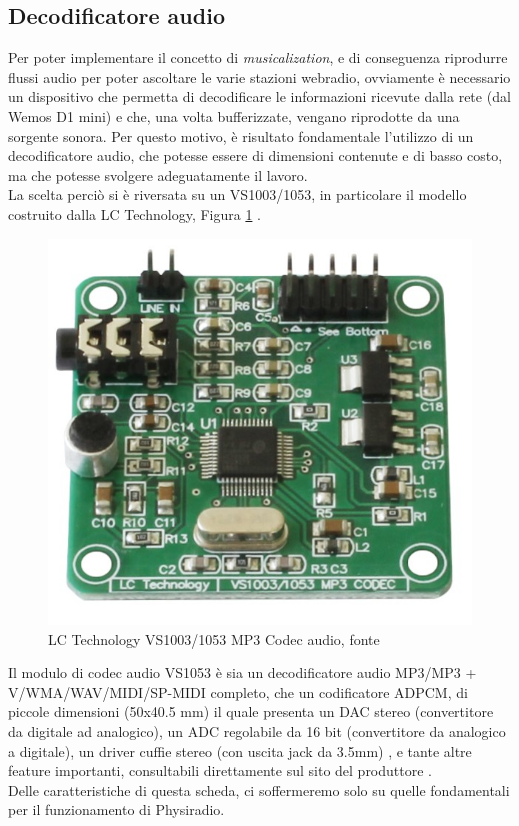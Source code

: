 \documentclass[12pt,a4paper]{report}
\newcommand{\physiradio}{Physiradio} %
\begin{document}
\subsection{Decodificatore audio}\label{sec:vs1053} %

Per poter implementare il concetto di \textit{musicalization}, e di conseguenza riprodurre flussi audio per poter ascoltare le varie stazioni webradio, ovviamente è necessario un dispositivo che permetta di decodificare le informazioni ricevute dalla rete (dal Wemos D1 mini) e che, una volta bufferizzate, vengano riprodotte da una sorgente sonora. 
Per questo motivo, è risultato fondamentale l'utilizzo di un decodificatore audio, che potesse essere di dimensioni contenute e di basso costo, ma che potesse svolgere adeguatamente il lavoro.\\
La scelta perciò si è riversata su un VS1003/1053, in particolare il modello costruito dalla LC Technology, Figura \ref{fig:vs1053} .

\begin{figure}[h]
	\begin{center}
		\centerline{\includegraphics[scale=0.35]{Immagini/LCTech_VS1053.jpg}}
		\caption{LC Technology VS1003/1053 MP3 Codec audio, fonte \cite{lcTechnologyVS1053}}
		\label{fig:vs1053}
	\end{center}
\end{figure}

Il modulo di codec audio VS1053 è sia un decodificatore audio MP3/MP3 + V/WMA/WAV/MIDI/SP-MIDI completo, che un codificatore ADPCM, di piccole dimensioni (50x40.5 mm)  il quale presenta un DAC stereo (convertitore da digitale ad analogico), un ADC regolabile da 16 bit (convertitore da analogico a digitale), un driver cuffie stereo (con uscita jack da 3.5mm) , e tante altre feature importanti, consultabili direttamente sul sito del produttore \cite{lcTechnologyVS1053}.\\
Delle caratteristiche di questa scheda, ci soffermeremo solo su quelle fondamentali per il funzionamento di \physiradio.
\end{document}
